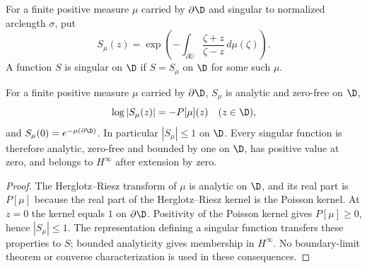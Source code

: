 \begin{definition}
  \label{def:singular_function_formula}
  \leanok
  For a finite positive measure $\mu$ carried by $\partial\D$ and singular
  to normalized arclength $\sigma$, put
  \[
    S_\mu(z)=\exp\left(-\int_{\partial\mathbb{D}}
      \frac{\zeta+z}{\zeta-z}\,d\mu(\zeta)\right).
  \]
  A function $S$ is singular on $\D$ if $S=S_\mu$ on $\D$ for some such $\mu$.
\end{definition}

\begin{theorem}
  \label{eq:II_5_9}
  \leanok
  For a finite positive measure $\mu$ carried by $\partial\D$, $S_\mu$ is
  analytic and zero-free on $\D$,
  \[
    \log|S_\mu(z)|=-P[\mu](z)\quad(z\in\D),
  \]
  and $S_\mu(0)=e^{-\mu(\partial\D)}$. In particular $|S_\mu|\le1$ on $\D$.
  Every singular function is therefore analytic, zero-free and bounded by one
  on $\D$, has positive value at zero, and belongs to $H^\infty$ after extension
  by zero.
  \begin{proof}
    \leanok
    The Herglotz--Riesz transform of $\mu$ is analytic on $\D$, and its real
    part is $P[\mu]$ because the real part of the Herglotz--Riesz kernel is the
    Poisson kernel. At $z=0$ the kernel equals $1$ on $\partial\D$.
    Positivity of the Poisson kernel gives $P[\mu]\ge0$, hence $|S_\mu|\le1$.
    The representation defining a singular function transfers these properties
    to $S$; bounded analyticity gives membership in $H^\infty$. No boundary-limit
    theorem or converse characterization is used in these consequences.
  \end{proof}
\end{theorem}

